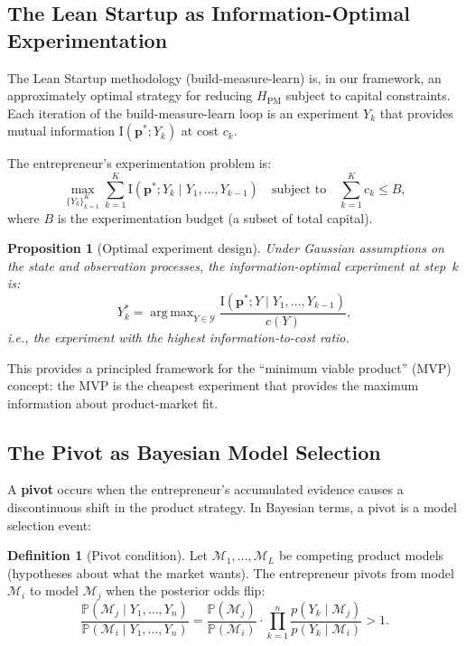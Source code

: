 \documentclass[12pt,a4paper,oneside]{book}
\newtheorem{proposition}[theorem]{Proposition}
\theoremstyle{definition}
\newtheorem{definition}[theorem]{Definition}
\theoremstyle{remark}
\newcommand{\Prob}{\mathbb{P}}
\newcommand{\MI}{\mathrm{I}}
\newcommand{\argmax}{\operatorname{arg\,max}}
\begin{document}
\subsection{The Lean Startup as Information-Optimal Experimentation}

The Lean Startup methodology (build-measure-learn) is, in our framework, an
approximately optimal strategy for reducing $H_{\text{PM}}$ subject to capital
constraints. Each iteration of the build-measure-learn loop is an experiment
$Y_k$ that provides mutual information $\MI(\mathbf{p}^*; Y_k)$ at cost $c_k$.

The entrepreneur's experimentation problem is:
\begin{equation}\label{eq:experiment_opt}
  \max_{\{Y_k\}_{k=1}^K} \sum_{k=1}^K \MI(\mathbf{p}^*; Y_k \mid Y_1, \ldots, Y_{k-1})
  \quad \text{subject to} \quad
  \sum_{k=1}^K c_k \leq B,
\end{equation}
where $B$ is the experimentation budget (a subset of total capital).

\begin{proposition}[Optimal experiment design]\label{prop:optimal_experiment}
Under Gaussian assumptions on the state and observation processes, the
information-optimal experiment at step~$k$ is:
\begin{equation}\label{eq:optimal_experiment}
  Y_k^* = \argmax_{Y \in \mathcal{Y}}
    \frac{\MI(\mathbf{p}^*; Y \mid Y_1, \ldots, Y_{k-1})}{c(Y)},
\end{equation}
i.e., the experiment with the highest information-to-cost ratio.
\end{proposition}

This provides a principled framework for the ``minimum viable product'' (MVP)
concept: the MVP is the cheapest experiment that provides the maximum
information about product-market fit.

\subsection{The Pivot as Bayesian Model Selection}

A \textbf{pivot} occurs when the entrepreneur's accumulated evidence causes a
discontinuous shift in the product strategy. In Bayesian terms, a pivot is a model
selection event:

\begin{definition}[Pivot condition]
Let $\mathcal{M}_1, \ldots, \mathcal{M}_L$ be competing product models
(hypotheses about what the market wants). The entrepreneur pivots from model
$\mathcal{M}_i$ to model $\mathcal{M}_j$ when the posterior odds flip:
\begin{equation}\label{eq:pivot}
  \frac{\Prob(\mathcal{M}_j \mid Y_1, \ldots, Y_n)}
    {\Prob(\mathcal{M}_i \mid Y_1, \ldots, Y_n)}
  = \frac{\Prob(\mathcal{M}_j)}{\Prob(\mathcal{M}_i)}
    \cdot \prod_{k=1}^n \frac{p(Y_k \mid \mathcal{M}_j)}
      {p(Y_k \mid \mathcal{M}_i)}
  > 1.
\end{equation}
\end{definition}
\end{document}
